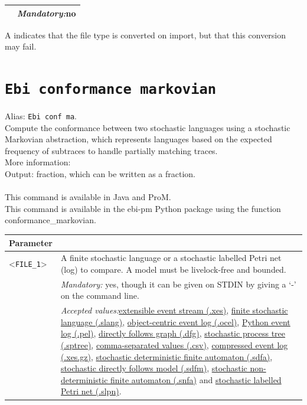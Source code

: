 {\begin{tabularx}{\linewidth}{lX}
&\textit{Mandatory:}\quad no\\
\bottomrule
\end{tabularx}
A \textdagger{} indicates that the file type is converted on import, but that this conversion may fail.
\clearpage\section{\texttt{Ebi conformance markovian}}
\label{command:Ebi conformance markovian}
Alias: \texttt{Ebi conf ma}.\\
Compute the conformance between two stochastic languages using a stochastic Markovian abstraction, which represents languages based on the expected frequency of subtraces to handle partially matching traces.\\
More information: \cite{DBLP:journals/procsci/RochaLA25}~\\
\noindent Output: fraction, which can be written as a fraction.\\
\\This command is available in Java and ProM.
\\This command is available in the ebi-pm Python package using the function conformance\_markovian.
\begin{tabularx}{\linewidth}{lX}
\toprule
Parameter \\\midrule
<\texttt{FILE\_1}>&A finite stochastic language or a stochastic labelled Petri net (log) to compare. A model must be livelock-free and bounded.\\
&\textit{Mandatory:} \quad yes, though it can be given on STDIN by giving a `-' on the command line.\\
&\textit{Accepted values:}\quad \hyperref[filehandler:extensible event stream]{extensible event stream (.xes)}, \hyperref[filehandler:finite stochastic language]{finite stochastic language (.slang)}, \hyperref[filehandler:object-centric event log]{object-centric event log (.ocel)}, \hyperref[filehandler:Python event log]{Python event log (.pel)}, \hyperref[filehandler:directly follows graph]{directly follows graph (.dfg)}, \hyperref[filehandler:stochastic process tree]{stochastic process tree (.sptree)}, \hyperref[filehandler:comma-separated values]{comma-separated values (.csv)}, \hyperref[filehandler:compressed event log]{compressed event log (.xes.gz)}, \hyperref[filehandler:stochastic deterministic finite automaton]{stochastic deterministic finite automaton (.sdfa)}, \hyperref[filehandler:stochastic directly follows model]{stochastic directly follows model (.sdfm)}, \hyperref[filehandler:stochastic non-deterministic finite automaton]{stochastic non-deterministic finite automaton (.snfa)} and \hyperref[filehandler:stochastic labelled Petri net]{stochastic labelled Petri net (.slpn)}.\\

\end{tabularx}}
